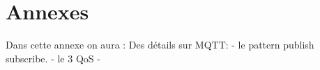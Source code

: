 \chapter{Annexes}
Dans cette annexe on aura : 
Des détails sur MQTT: 
- le pattern publish subscribe. 
- le 3 QoS
- 
